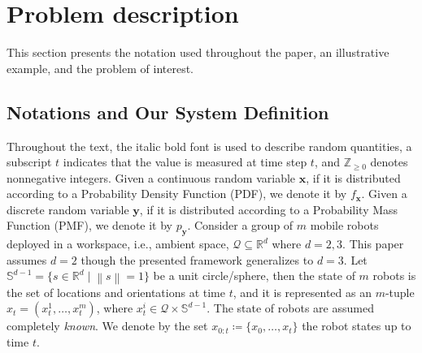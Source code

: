 \documentclass[letterpaper, 10 pt, conference]{ieeeconf}
\begin{document}
%




\section{Problem description}
\label{sec:sec2}

This section presents the notation used throughout the paper, an illustrative example, and the problem of interest.
\subsection{Notations and Our System Definition}
\label{sec:sec21}
Throughout the text, the italic bold font is used to describe random quantities, a subscript $t$ indicates that the value is measured at time step $t$, and $\mathbb{Z}_{\geq 0}$ denotes nonnegative integers. %
Given a continuous random variable $\bm{x}$, if it is distributed according to a Probability Density Function (PDF), we denote it by $f_{\bm{x}}$.
Given a discrete random variable $\bm{y}$, if it is distributed according to a Probability Mass Function (PMF), we denote it by $p_{\bm{y}}$.
Consider a group of $m$ mobile robots deployed in a workspace, i.e., ambient space, $\mathcal{Q} \subseteq \mathbb{R}^d$ where $d = 2,3$. 
This paper assumes $d=2$ though the presented framework generalizes to $d=3$. 
Let $\mathbb{S}^{d-1} = \lbrace s\in \mathbb{R}^d\mid \left\| s \right\|=1 \rbrace$ be a unit circle/sphere, then the state of $m$ robots is the set of locations and orientations at time $t$, and it is represented as an $m$-tuple $x_t = (x_t^1,\dots,x_t^m)$, where $x_t^i \in \mathcal{Q} \times \mathbb{S}^{d-1}$. The state of robots are assumed completely \emph{known}.
We denote by the set ${x}_{0:t}\coloneqq \lbrace {x}_0,\dots,{x}_t \rbrace$ the robot states up to time $t$. 
\end{document}
